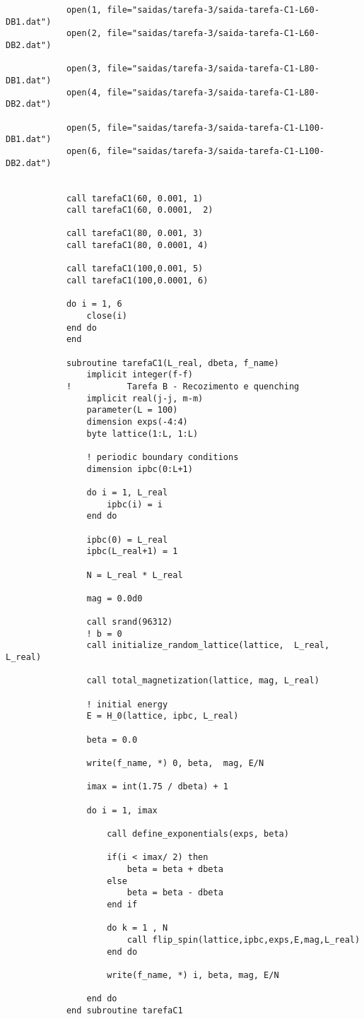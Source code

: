 \begin{verbatim}
            open(1, file="saidas/tarefa-3/saida-tarefa-C1-L60-DB1.dat")
            open(2, file="saidas/tarefa-3/saida-tarefa-C1-L60-DB2.dat")

            open(3, file="saidas/tarefa-3/saida-tarefa-C1-L80-DB1.dat")
            open(4, file="saidas/tarefa-3/saida-tarefa-C1-L80-DB2.dat")

            open(5, file="saidas/tarefa-3/saida-tarefa-C1-L100-DB1.dat")
            open(6, file="saidas/tarefa-3/saida-tarefa-C1-L100-DB2.dat")


            call tarefaC1(60, 0.001, 1)
            call tarefaC1(60, 0.0001,  2)

            call tarefaC1(80, 0.001, 3)
            call tarefaC1(80, 0.0001, 4)

            call tarefaC1(100,0.001, 5)
            call tarefaC1(100,0.0001, 6)

            do i = 1, 6
                close(i)
            end do
            end

            subroutine tarefaC1(L_real, dbeta, f_name)
                implicit integer(f-f)
            !           Tarefa B - Recozimento e quenching
                implicit real(j-j, m-m)
                parameter(L = 100)
                dimension exps(-4:4)
                byte lattice(1:L, 1:L)

                ! periodic boundary conditions
                dimension ipbc(0:L+1)

                do i = 1, L_real
                    ipbc(i) = i
                end do  

                ipbc(0) = L_real
                ipbc(L_real+1) = 1

                N = L_real * L_real

                mag = 0.0d0

                call srand(96312)
                ! b = 0
                call initialize_random_lattice(lattice,  L_real, L_real)

                call total_magnetization(lattice, mag, L_real)

                ! initial energy
                E = H_0(lattice, ipbc, L_real)

                beta = 0.0

                write(f_name, *) 0, beta,  mag, E/N

                imax = int(1.75 / dbeta) + 1 

                do i = 1, imax

                    call define_exponentials(exps, beta)

                    if(i < imax/ 2) then 
                        beta = beta + dbeta 
                    else
                        beta = beta - dbeta 
                    end if  

                    do k = 1 , N
                        call flip_spin(lattice,ipbc,exps,E,mag,L_real)
                    end do   

                    write(f_name, *) i, beta, mag, E/N

                end do
            end subroutine tarefaC1
\end{verbatim}
